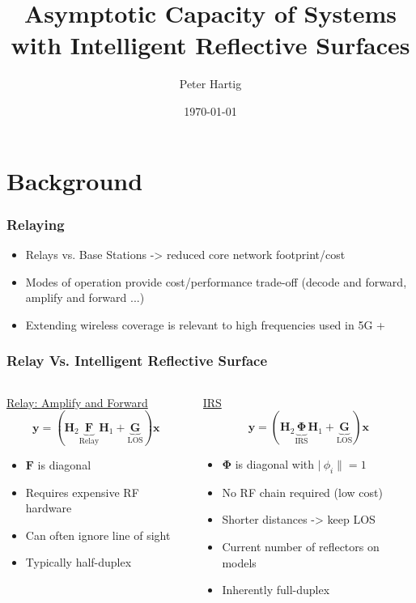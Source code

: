\documentclass[10pt,tgadventor, onlymath]{beamer}
\title{\large \bfseries Asymptotic Capacity of Systems with Intelligent Reflective Surfaces}
\author{Peter Hartig\\[3ex]}
\date{\today}
\begin{document}
\frame{
\thispagestyle{empty}
\titlepage
}

\section{Background}

\begin{frame}
\frametitle{Relaying}

	\begin{itemize}
		\item 			
			Relays vs. Base Stations -> reduced core network footprint/cost
		\item 
			Modes of operation provide cost/performance trade-off (decode and forward, amplify and forward ...)
		\item 
			Extending wireless coverage is relevant to high frequencies used in 5G +
	\end{itemize}

\end{frame}

\begin{frame}
\frametitle{Relay Vs. Intelligent Reflective Surface}
\begin{columns}
\begin{column}{0.5\linewidth}
\centering 
	\underline{Relay: Amplify and Forward}
	\\
	\begin{equation*}
	\mathbf{y} = (\mathbf{H}_2\underbrace{\mathbf{F}}_{\text{Relay}}\mathbf{H}_1 + \underbrace{\mathbf{G}}_{\text{LOS}})\mathbf{x}
	\end{equation*}
	
	\begin{itemize}
	\item 
		$\mathbf{F}$ is diagonal
	\item 
		Requires expensive RF hardware
	\item 
		Can often ignore line of sight
	\item 
		Typically half-duplex
	\end{itemize}
\end{column}
\begin{column}{0.5\linewidth}
\centering 

	\underline{IRS}
	\\
	\begin{equation*}
	\mathbf{y} = (\mathbf{H}_2\underbrace{\boldsymbol{\Phi}}_{\text{IRS}}\mathbf{H}_1 + \underbrace{\mathbf{G}}_{\text{LOS}})\mathbf{x}
	\end{equation*} 
	\begin{itemize}
	\item 
		$\boldsymbol{\Phi}$ is diagonal with $|\ \phi_i \| =1$
	\item 
		No RF chain required (low cost)
	\item
		Shorter distances -> keep LOS
	\item 
		Current number of reflectors on models
	\item 
		Inherently full-duplex
	\end{itemize}
\end{column}
\end{columns}

\end{frame}
\end{document}
